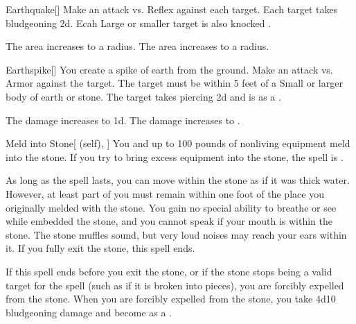 \lowercase{\hypertarget{spell:Earthquake}{}}\label{spell:Earthquake}
\begin{freeability}[Rank 3]{\hypertarget{spell:Earthquake}{Earthquake}}[]
Make an attack vs. Reflex against each target.
\hit Each target takes bludgeoning  \minus2d.
Ecah Large or smaller target is also knocked .

\rankline
{} The area increases to a \arealarge radius.
 The area increases to a \areahuge radius.
\end{freeability}
\vspace{0.25em}



\lowercase{\hypertarget{spell:Earthspike}{}}\label{spell:Earthspike}
\begin{freeability}[Rank 3]{\hypertarget{spell:Earthspike}{Earthspike}}[]
You create a spike of earth from the ground.
Make an attack vs. Armor against the target.
The target must be within 5 feet of a Small or larger body of earth or stone.
\hit The target takes piercing  \minus2d and is  as a .

\rankline
{} The damage increases to  \minus1d.
 The damage increases to .
\end{freeability}
\vspace{0.25em}



\lowercase{\hypertarget{spell:Meld into Stone}{}}\label{spell:Meld into Stone}
\begin{attuneability}[Rank 3]{\hypertarget{spell:Meld into Stone}{Meld into Stone}}[ (self), ]
You and up to 100 pounds of nonliving equipment meld into the stone.
If you try to bring excess equipment into the stone, the spell is .

As long as the spell lasts, you can move within the stone as if it was thick water.
However, at least part of you must remain within one foot of the place you originally melded with the stone.
You gain no special ability to breathe or see while embedded the stone, and you cannot speak if your mouth is within the stone.
The stone muffles sound, but very loud noises may reach your ears within it.
If you fully exit the stone, this spell ends.

If this spell ends before you exit the stone, or if the stone stops being a valid target for the spell (such as if it is broken into pieces), you are forcibly expelled from the stone.
When you are forcibly expelled from the stone, you take 4d10 bludgeoning damage and become  as a .
\end{attuneability}
\vspace{0.25em}



